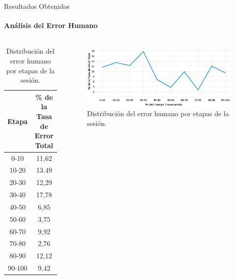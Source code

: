 \begin{frame}{Resultados Obtenidos}
\framesubtitle{An\'alisis del Error Humano}

\begin{columns}
\centering
\begin{table}
\tiny
\begin{tabular}{|c|c|}
\hline
    Etapa & \% de la Tasa de Error Total \\
    \hline
0-10  &  11,62 \\
10-20 &  13.49 \\
20-30 &  12,29 \\
30-40 &  17,78 \\
40-50 &  6,85 \\
50-60 &  3,75 \\
60-70 &  9,92 \\
70-80 &  2,76 \\
80-90 &  12,12 \\
90-100 & 9,42 \\
    \hline
\end{tabular}
\caption{Distribuci\'on del error humano por etapas de la sesi\'on.}
\label{sec:error-tiempo}
\end{table}

\begin{figure}
\centering
\includegraphics[width=1\linewidth]{./graphics/error_tiempo.png}
\caption{Distribuci\'on del error humano por etapas de la sesi\'on.}
\label{figure:gerror-tiempo}
\end{figure}
\end{columns}

\end{frame}

